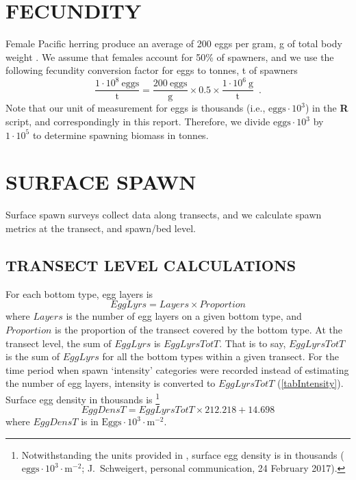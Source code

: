 \documentclass[12pt]{article}
\begin{document}
\section{FECUNDITY}\label{secFecund}

Female Pacific herring produce an average of 200 eggs per gram, g of total body weight \citep{Hay1985}.
We assume that females account for 50\% of spawners, and we use the following fecundity conversion factor for eggs to tonnes, t of spawners
\begin{equation}
\frac {1 \cdot 10^{8}~\text{eggs}} {\text{t}} = \frac{200~\text{eggs}} {\text{g}} \times 0.5 \times \frac{1 \cdot 10^{6}~\text{g}} {\text{t}} \enspace .
\label{eqFecundityConv}
\end{equation}
Note that our unit of measurement for eggs is thousands (i.e., $\text{eggs} \cdot 10^{3}$) in the \textbf{R} script, and correspondingly in this report.
Therefore, we divide $\text{eggs} \cdot 10^{3}$ by $1 \cdot 10^{5}$ to determine spawning biomass in tonnes.

\section{SURFACE SPAWN}\label{secSurf}

Surface spawn surveys collect data along transects, and we calculate spawn metrics at the transect, and spawn/bed level.

\subsection{TRANSECT LEVEL CALCULATIONS}

For each bottom type, egg layers is
\begin{equation}
EggLyrs = Layers \times Proportion
\label{eqEggLayersSurf}
\end{equation}
where $Layers$ is the number of egg layers on a given bottom type, and $Proportion$ is the proportion of the transect covered by the bottom type.
At the transect level, the sum of $EggLyrs$ is $EggLyrsTotT$.
That is to say, $EggLyrsTotT$ is the sum of $EggLyrs$ for all the bottom types within a given transect.
For the time period when spawn `intensity' categories were recorded instead of estimating the number of egg layers, intensity is converted to $EggLyrsTotT$ (\autoref{tabIntensity}).
Surface egg density in thousands is \citep{SchweigertEtal1997}%
\footnote{Notwithstanding the units provided in \cite{SchweigertEtal1997}, surface egg density is in thousands ($\text{eggs} \cdot 10^{3} \cdot \text{m}^{-2}$; J.~Schweigert, personal communication, 24 February 2017).}
\begin{equation}
EggDensT = EggLyrsTotT \times 212.218 + 14.698
\label{eqEggDensSurf}
\end{equation}
where $EggDensT$ is in $\text{Eggs} \cdot 10^{3} \cdot \text{m}^{-2}$. 
\end{document}
